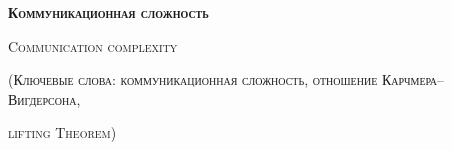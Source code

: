 


\thispagestyle{empty}

\centerline{\large \textsc{\textbf{Коммуникационная сложность}}}
\centerline{\textsc{Communication complexity}}
\centerline{\small \textsc{(Ключевые слова: коммуникационная сложность, отношение Карчмера--Вигдерсона,}}
\centerline{\small \textsc{lifting Theorem)}}

\bigskip



\vspace{1cm}


\nocite{*}
\printbibliography



